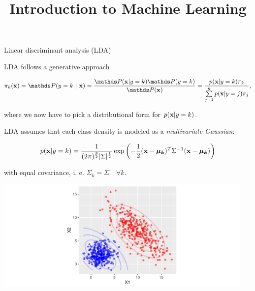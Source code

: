 \documentclass[11pt,compress,t,notes=noshow, xcolor=table]{beamer}
\title{Introduction to Machine Learning}
\institute{\href{https://compstat-lmu.github.io/lecture_i2ml/}{compstat-lmu.github.io/lecture\_i2ml}}
\date{}
\begin{document}
\framebreak



\begin{vbframe}{Linear discriminant analysis (LDA)}


LDA follows a generative approach

$$\pikx = \postk = \frac{\P(\xv | y = k) \P(y = k)}{\P(\xv)} = \frac{\pdfxyk \pik}{\sumjg \pdfxyk[j] \pi_j},$$
  
where we now have to pick a distributional form for $p(\mathbf{x} | y= k)$.

\framebreak

LDA assumes that each class density is modeled as a \emph{multivariate Gaussian}:

$$
p(\mathbf{x} | y= k) = \frac{1}{(2\pi)^{\frac{p}{2}}|\Sigma|^{\frac{1}{2}}} \exp\left(-\frac{1}{2}(\mathbf{x} - \bm{\mu_k})^T \Sigma^{-1} (\mathbf{x} - \bm{\mu_k})\right)
$$

with equal covariance, i. e. $\Sigma_k = \Sigma \quad \forall k$. \\


\begin{knitrout}\scriptsize
{}\color{fgcolor}

{\centering \includegraphics[width=0.95\textwidth]{figure/reg_class_dis_1} 

}
\end{knitrout}
\end{vbframe}
\end{document}

